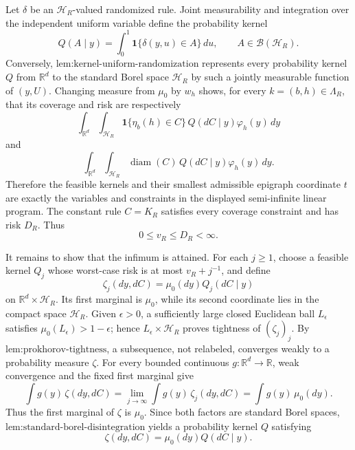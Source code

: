 Let \(\delta\) be an \(\mathcal H_R\)-valued randomized rule.  Joint measurability and integration over the independent uniform variable define the probability kernel
\[
Q(A\mid y)=\int_0^1\mathbf 1\{\delta(y,u)\in A\}\,du,
\qquad A\in\mathcal B(\mathcal H_R).
\]
Conversely, \(\text{lem:kernel-uniform-randomization}\) represents every probability kernel \(Q\) from \(\mathbb R^d\) to the standard Borel space \(\mathcal H_R\) by such a jointly measurable function of \((y,U)\).  Changing measure from \(\mu_0\) by \(w_h\) shows, for every \(k=(b,h)\in\Lambda_R\), that its coverage and risk are respectively
\[
\int_{\mathbb R^d}\!\int_{\mathcal H_R}
 \mathbf 1\{\eta_b(h)\in C\}\,Q(dC\mid y)\varphi_h(y)\,dy
\]
and
\[
\int_{\mathbb R^d}\!\int_{\mathcal H_R}
 \operatorname{diam}(C)\,Q(dC\mid y)\varphi_h(y)\,dy.
\]
Therefore the feasible kernels and their smallest admissible epigraph coordinate \(t\) are exactly the variables and constraints in the displayed semi-infinite linear program.  The constant rule \(C=K_R\) satisfies every coverage constraint and has risk \(D_R\).  Thus
\[
0\le v_R\le D_R<\infty.
\]

It remains to show that the infimum is attained.  For each \(j\ge1\), choose a feasible kernel \(Q_j\) whose worst-case risk is at most \(v_R+j^{-1}\), and define
\[
\zeta_j(dy,dC)=\mu_0(dy)Q_j(dC\mid y)
\]
on \(\mathbb R^d\times\mathcal H_R\).  Its first marginal is \(\mu_0\), while its second coordinate lies in the compact space \(\mathcal H_R\).  Given \(\epsilon>0\), a sufficiently large closed Euclidean ball \(L_\epsilon\) satisfies \(\mu_0(L_\epsilon)>1-\epsilon\); hence \(L_\epsilon\times\mathcal H_R\) proves tightness of \((\zeta_j)_j\).  By \(\text{lem:prokhorov-tightness}\), a subsequence, not relabeled, converges weakly to a probability measure \(\zeta\).  For every bounded continuous \(g:\mathbb R^d\to\mathbb R\), weak convergence and the fixed first marginal give
\[
\int g(y)\,\zeta(dy,dC)
=\lim_{j\to\infty}\int g(y)\,\zeta_j(dy,dC)
=\int g(y)\,\mu_0(dy).
\]
Thus the first marginal of \(\zeta\) is \(\mu_0\).  Since both factors are standard Borel spaces, \(\text{lem:standard-borel-disintegration}\) yields a probability kernel \(Q\) satisfying
\[
\zeta(dy,dC)=\mu_0(dy)Q(dC\mid y).
\]

